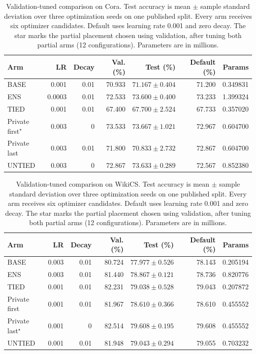 \begin{table}[t]
\centering
\caption{Validation-tuned comparison on Cora. Test accuracy is mean $\pm$ sample standard deviation over three optimization seeds on one published split. Every arm receives six optimizer candidates. Default uses learning rate 0.001 and zero decay. The star marks the partial placement chosen using validation, after tuning both partial arms (12 configurations). Parameters are in millions.}
\label{tab:tuned-cora}
\small
\setlength{\tabcolsep}{4pt}
\begin{tabular}{lrrrrrr}
\toprule
Arm & LR & Decay & Val. (\%) & Test (\%) & Default (\%) & Params\\
\midrule
BASE & 0.001 & 0.01 & 70.933 & $71.167 \pm 0.404$ & 71.200 & 0.349831\\
ENS & 0.0003 & 0.01 & 72.533 & $73.600 \pm 0.400$ & 73.233 & 1.399324\\
TIED & 0.001 & 0.01 & 67.400 & $67.700 \pm 2.524$ & 67.733 & 0.357020\\
Private first$^{\star}$ & 0.003 & 0 & 73.533 & $73.667 \pm 1.021$ & 72.967 & 0.604700\\
Private last & 0.003 & 0.01 & 71.800 & $70.833 \pm 2.732$ & 72.867 & 0.604700\\
UNTIED & 0.003 & 0 & 72.867 & $73.633 \pm 0.289$ & 72.567 & 0.852380\\
\bottomrule
\end{tabular}
\end{table}

\begin{table}[t]
\centering
\caption{Validation-tuned comparison on WikiCS. Test accuracy is mean $\pm$ sample standard deviation over three optimization seeds on one published split. Every arm receives six optimizer candidates. Default uses learning rate 0.001 and zero decay. The star marks the partial placement chosen using validation, after tuning both partial arms (12 configurations). Parameters are in millions.}
\label{tab:tuned-wikics}
\small
\setlength{\tabcolsep}{4pt}
\begin{tabular}{lrrrrrr}
\toprule
Arm & LR & Decay & Val. (\%) & Test (\%) & Default (\%) & Params\\
\midrule
BASE & 0.003 & 0.01 & 80.724 & $77.977 \pm 0.526$ & 78.143 & 0.205194\\
ENS & 0.003 & 0.01 & 81.440 & $78.867 \pm 0.121$ & 78.736 & 0.820776\\
TIED & 0.001 & 0.01 & 82.231 & $79.038 \pm 0.528$ & 79.043 & 0.207872\\
Private first & 0.001 & 0.01 & 81.967 & $78.610 \pm 0.366$ & 78.610 & 0.455552\\
Private last$^{\star}$ & 0.001 & 0 & 82.514 & $79.608 \pm 0.195$ & 79.608 & 0.455552\\
UNTIED & 0.001 & 0.01 & 81.948 & $79.043 \pm 0.294$ & 79.055 & 0.703232\\
\bottomrule
\end{tabular}
\end{table}

